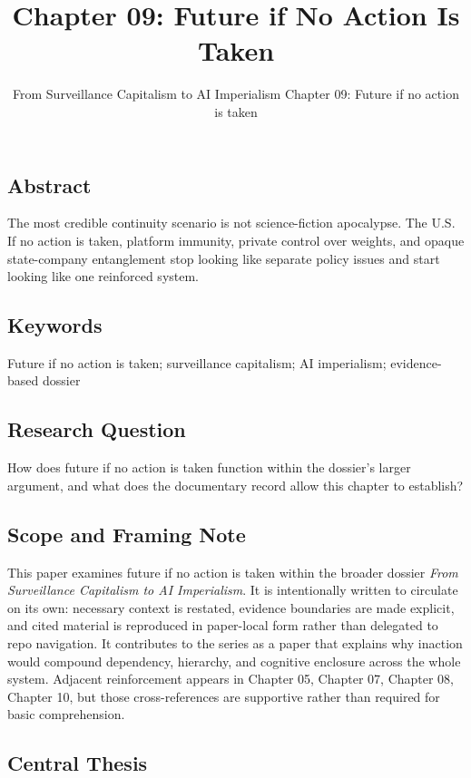 \documentclass[
  american,
  11pt,
  letterpaper,
]{article}
\title{Chapter 09: Future if No Action Is Taken}
\subtitle{From Surveillance Capitalism to AI Imperialism \textbar{}
Chapter 09: Future if no action is taken}
\author{}
\date{}
\begin{document}
\maketitle

\subsection{Abstract}\label{abstract}

The most credible continuity scenario is not science-fiction apocalypse.
The U.S. If no action is taken, platform immunity, private control over
weights, and opaque state-company entanglement stop looking like
separate policy issues and start looking like one reinforced system.

\subsection{Keywords}\label{keywords}

Future if no action is taken; surveillance capitalism; AI imperialism;
evidence-based dossier

\subsection{Research Question}\label{research-question}

How does future if no action is taken function within the dossier's
larger argument, and what does the documentary record allow this chapter
to establish?

\subsection{Scope and Framing Note}\label{scope-and-framing-note}

This paper examines future if no action is taken within the broader
dossier \emph{From Surveillance Capitalism to AI Imperialism}. It is
intentionally written to circulate on its own: necessary context is
restated, evidence boundaries are made explicit, and cited material is
reproduced in paper-local form rather than delegated to repo navigation.
It contributes to the series as a paper that explains why inaction would
compound dependency, hierarchy, and cognitive enclosure across the whole
system. Adjacent reinforcement appears in Chapter 05, Chapter 07,
Chapter 08, Chapter 10, but those cross-references are supportive rather
than required for basic comprehension.

\subsection{Central Thesis}\label{central-thesis}
\end{document}
